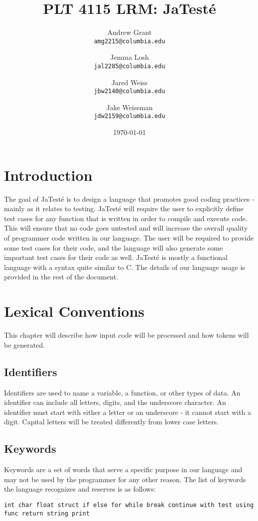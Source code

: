 \documentclass{article}
\title{PLT 4115 LRM: \textbf{JaTest\'{e}}}
\author{
	Andrew Grant\\
	\texttt{amg2215@columbia.edu}
	\and
	Jemma Losh\\
	\texttt{jal2285@columbia.edu}
	\and
	Jared Weiss\\
	\texttt{jbw2140@columbia.edu}
	\and
	Jake Weissman\\
	\texttt{jdw2159@columbia.edu}
}
\date{\today}
\begin{document}
\maketitle

\section{Introduction}
The goal of JaTest\'{e} is to design a language that promotes good coding practices - mainly as it relates to testing.  JaTest\'{e} will require the user to explicitly define test cases for any function that is written in order to compile and execute code.  This will ensure that no code goes untested and will increase the overall quality of programmer code written in our language.  The user will be required to provide some test cases for their code, and the language will also generate some important test cases for their code as well.  JaTest\'{e} is mostly a functional language with a syntax quite similar to C.  The details of our language usage is provided in the rest of the document.

\section{Lexical Conventions}
This chapter will describe how input code will be processed and how tokens will be generated.

\subsection{Identifiers}
Identifiers are used to name a variable, a function, or other types of data.  An identifier can include all letters, digits, and the underscore character.  An identifier must start with either a letter or an underscore - it cannot start with a digit.  Capital letters will be treated differently from lower case letters.

\subsection{Keywords}
Keywords are a set of words that serve a specific purpose in our language and may not be used by the programmer for any other reason.  The list of keywords the language recognizes and reserves is as follows: 

\texttt{int char float struct if else for while break continue with test using func return string print}
\end{document}

